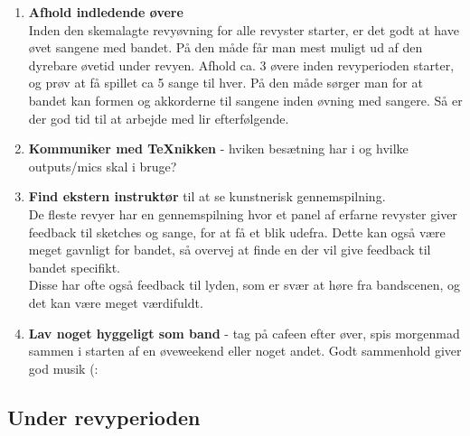 \begin{enumerate}
\item \textbf{Afhold indledende øvere}\\
Inden den skemalagte revyøvning for alle revyster starter, er det godt at have øvet sangene med bandet. På den måde får man mest muligt ud af den dyrebare øvetid under revyen. Afhold ca. 3 øvere inden revyperioden starter, og prøv at få spillet ca 5 sange til hver. På den måde sørger man for at bandet kan formen og akkorderne til sangene inden øvning med sangere. Så er der god tid til at arbejde med lir efterfølgende.

\item \textbf{Kommuniker med TeXnikken} - hviken besætning har i og hvilke outputs/mics skal i bruge?

\item \textbf{Find ekstern instruktør} til at se kunstnerisk gennemspilning.\\
De fleste revyer har en gennemspilning hvor et panel af erfarne revyster giver feedback til sketches og sange, for at få et blik udefra. Dette kan også være meget gavnligt for bandet, så overvej at finde en der vil give feedback til bandet specifikt.\\
Disse har ofte også feedback til lyden, som er svær at høre fra bandscenen, og det kan være meget værdifuldt.

\item \textbf{Lav noget hyggeligt som band} - tag på cafeen efter øver, spis morgenmad sammen i starten af en øveweekend eller noget andet. Godt sammenhold giver god musik (:
\end{enumerate}

\subsection*{Under revyperioden}

